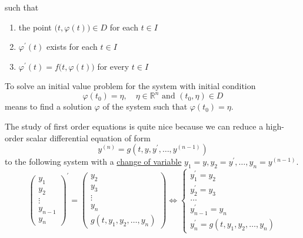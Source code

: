 \documentclass{article}
\newcounter{definition}[section]
\begin{document}
\begin{definition}
\begin{equation}
    \end{equation}
    such that
    \begin{enumerate}
        \item the point $\big(t, \varphi(t)\big) \in D$ for each $t \in I$
        \item $\varphi^\prime (t)$ exists for each $t \in I$
        \item $\varphi^\prime (t) = f \big( t, \varphi(t)\big)$ for every $t \in I$ 
    \end{enumerate}
    To solve an initial value problem for the system with initial condition 
    \begin{equation}
      \varphi(t_0) = \eta, \quad \eta \in \mathbb{R}^n \text{ and } (t_0, \eta) \in D
    \end{equation}
    means to find a solution $\varphi$ of the system such that $\varphi(t_0) = \eta$. 
    \end{definition}

    The study of first order equations is quite nice because we can reduce a high-order scalar differential equation of form
    \begin{equation}
      y^{(n)} = g(t, y, y^\prime, \ldots, y^{(n-1)})
    \end{equation}
    to the following system with a \hyperref[real-thm:change-of-variable]{change of variable} $y_1 = y, y_2 = y^\prime, \ldots, y_n = y^{(n-1)}$. 
    \begin{equation}
      \begin{pmatrix}
          y_1 \\ y_2 \\ \vdots \\ y_{n-1} \\ y_n
          \end{pmatrix}^\prime = \begin{pmatrix}
          y_2 \\ y_3 \\ \vdots \\ y_n \\ g(t, y_1, y_2, \ldots, y_n)
          \end{pmatrix} \iff \begin{cases}
          y_1^\prime = y_2 \\
          y_2^\prime = y_3 \\
          \ldots \\
          y_{n-1}^\prime = y_n \\
          y_n^\prime = g(t, y_1, y_2, \ldots, y_n)
          \end{cases}
    \end{equation}
\end{document}
